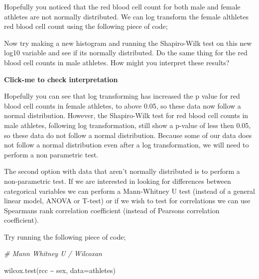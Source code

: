 \documentclass[
]{book}
\newenvironment{Shaded}{\begin{snugshade}}{\end{snugshade}}
\newcommand{\AttributeTok}[1]{\textcolor[rgb]{0.77,0.63,0.00}{#1}}
\newcommand{\CommentTok}[1]{\textcolor[rgb]{0.56,0.35,0.01}{\textit{#1}}}
\newcommand{\FunctionTok}[1]{\textcolor[rgb]{0.00,0.00,0.00}{#1}}
\newcommand{\NormalTok}[1]{#1}
\newcommand{\OtherTok}[1]{\textcolor[rgb]{0.56,0.35,0.01}{#1}}
\newcommand{\SpecialCharTok}[1]{\textcolor[rgb]{0.00,0.00,0.00}{#1}}
\begin{document}
Hopefully you noticed that the red blood cell count for both male and female athletes are not normally distributed. We can log transform the female althletes red blood cell count using the following piece of code;

\begin{Shaded}
\end{Shaded}

Now try making a new histogram and running the Shapiro-Wilk test on this new log10 variable and see if its normally distributed. Do the same thing for the red blood cell counts in male athletes. How might you interpret these results?

\textbf{Click-me to check interpretation}

Hopefully you can see that log transforming has increased the p value for red blood cell counts in female athletes, to above 0.05, so these data now follow a normal distribution. However, the Shapiro-Wilk test for red blood cell counts in male athletes, following log transformation, still show a p-value of less then 0.05, so these data do not follow a normal distribution. Because some of our data does not follow a normal distribution even after a log transformation, we will need to perform a non parametric test.

The second option with data that aren't normally distributed is to perform a non-parametric test. If we are interested in looking for differences between categorical variables we can perform a Mann-Whitney U test (instead of a general linear model, ANOVA or T-test) or if we wish to test for correlations we can use Spearmans rank correlation coefficient (instead of Pearsons correlation coefficient).

Try running the following piece of code;

\begin{Shaded}
\begin{Highlighting}[]
\CommentTok{\# Mann Whitney U / Wilcoxan }

\FunctionTok{wilcox.test}\NormalTok{(rcc }\SpecialCharTok{\textasciitilde{}}\NormalTok{ sex, }\AttributeTok{data=}\NormalTok{athletes) }
\end{Highlighting}
\end{Shaded}
\end{document}
